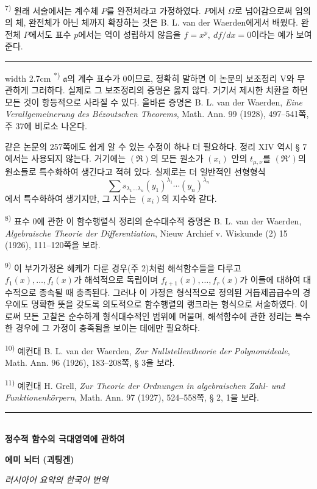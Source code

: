 {\noindent\textsuperscript{7)} 원래 서술에서는 계수체 \(P\)를 완전체라고 가정하였다. \(P\)에서 \(\Omega\)로 넘어감으로써 임의의 체, 완전체가 아닌 체까지 확장하는 것은 B. L. van der Waerden에게서 배웠다. 완전체 \(P\)에서도 표수 \(p\)에서는 역이 성립하지 않음을 \(f=x^p,\ df/dx=0\)이라는 예가 보여 준다.

\medskip
\hrule width 2.7cm
\smallskip
\noindent\textsuperscript{*)} \(\mathfrak a\)의 계수 표수가 0이므로, 정확히 말하면 이 논문의 보조정리 V와 무관하게 그러하다. 실제로 그 보조정리의 증명은 옳지 않다. 거기서 제시한 치환을 하면 모든 것이 항등적으로 사라질 수 있다. 올바른 증명은 B. L. van der Waerden, \emph{Eine Verallgemeinerung des Bézoutschen Theorems}, Math. Ann. 99 (1928), 497--541쪽, 주 37에 비로소 나온다.

같은 논문의 257쪽에도 쉽게 알 수 있는 수정이 하나 더 필요하다. 정리 XIV 역시 § 7에서는 사용되지 않는다. 거기에는 \((\mathfrak R)\)의 모든 원소가 \((x_i)\) 안의 \(t_{\mu,\nu}\)를 \((\mathfrak R')\)의 원소들로 특수화하여 생긴다고 적혀 있다. 실제로는 더 일반적인 선형형식
\[
\sum s_{\lambda_1\ldots\lambda_n}
(y_1)^{\lambda_1}\cdots(y_n)^{\lambda_n}
\]
에서 특수화하여 생기지만, 그 지수는 \((x_i)\)의 지수와 같다.

\noindent\textsuperscript{8)} 표수 0에 관한 이 함수행렬식 정리의 순수대수적 증명은 B. L. van der Waerden, \emph{Algebraische Theorie der Differentiation}, Nieuw Archief v. Wiskunde (2) 15 (1926), 111--120쪽을 보라.

\noindent\textsuperscript{9)} 이 부가가정은 헤케가 다룬 경우(주 2)처럼 해석함수들을 다루고 \(f_1(x),\ldots,f_t(x)\)가 해석적으로 독립이며 \(f_{t+1}(x),\ldots,f_r(x)\)가 이들에 대하여 대수적으로 종속될 때 충족된다. 그러나 이 가정은 형식적으로 정의된 거듭제곱급수의 경우에도 명확한 뜻을 갖도록 의도적으로 함수행렬의 랭크라는 형식으로 서술하였다. 이로써 모든 고찰은 순수하게 형식대수적인 범위에 머물며, 해석함수에 관한 정리는 특수한 경우에 그 가정이 충족됨을 보이는 데에만 필요하다.

\noindent\textsuperscript{10)} 예컨대 B. L. van der Waerden, \emph{Zur Nullstellentheorie der Polynomideale}, Math. Ann. 96 (1926), 183--208쪽, § 3을 보라.

\noindent\textsuperscript{11)} 예컨대 H. Grell, \emph{Zur Theorie der Ordnungen in algebraischen Zahl- und Funktionenkörpern}, Math. Ann. 97 (1927), 524--558쪽, § 2, 1을 보라.
}

\bigskip
\begin{center}
\rule{4cm}{0.4pt}\\[0.8em]
{\Large\bfseries 정수적 함수의 극대영역에 관하여}\par
\vspace{0.7em}
{\bfseries 에미 뇌터 (괴팅겐)}\par
\vspace{0.5em}
\emph{러시아어 요약의 한국어 번역}
\end{center}

